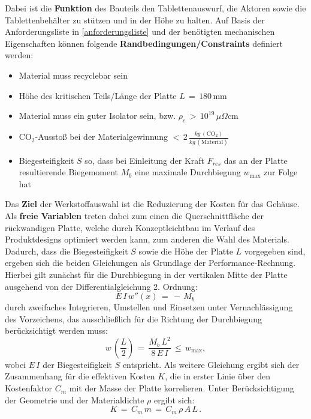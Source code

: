 Dabei ist die \textbf{Funktion} des Bauteils den Tablettenauswurf, die Aktoren sowie die Tablettenbehälter zu stützen und in der Höhe zu halten. Auf Basis der Anforderungsliste in \ref{anforderungsliste} und der benötigten mechanischen Eigenschaften können folgende \textbf{Randbedingungen/Constraints} definiert werden:
\begin{itemize}
	\item Material muss recyclebar sein
	\item Höhe des kritischen Teils/Länge der Platte $L\,=\,180\,$mm
	\item Material muss ein guter Isolator sein, bzw. $\rho_e\,>\,10^{19}\,\mu\Omega$cm
	\item CO$_2$-Ausstoß bei der Materialgewinnung $<\,2\,\frac{kg\,(\text{CO}_2)}{kg\,(\text{Material})}$
	\item Biegesteifigkeit $S$ so, dass bei Einleitung der Kraft $F_{res}$ das an der Platte resultierende Biegemoment $M_b$ eine maximale Durchbiegung $w_{\text{max}}$ zur Folge hat
\end{itemize}
Das \textbf{Ziel} der Werkstoffauswahl ist die Reduzierung der Kosten für das Gehäuse. Als \textbf{freie Variablen} treten dabei zum einen die Querschnittfläche der rückwandigen Platte, welche durch Konzeptleichtbau im Verlauf des Produktdesigns optimiert werden kann, zum anderen die Wahl des Materials.
Dadurch, dass die Biegesteifigkeit $S$ sowie die Höhe der Platte $L$ vorgegeben sind, ergeben sich die beiden Gleichungen als Grundlage der Performance-Rechnung. Hierbei gilt zunächst für die Durchbiegung in der vertikalen Mitte der Platte ausgehend von der Differentialgleichung 2. Ordnung:
\begin{equation}
	E\,I\,w''(x)\,=\,-\,M_b\,
\end{equation}
durch zweifaches Integrieren, Umstellen und Einsetzen unter Vernachlässigung des Vorzeichens, das ausschließlich für die Richtung der Durchbiegung berücksichtigt werden muss:
\begin{equation} \label{durchbiegung}
	w\,\left(\frac{L}{2}\right)\,=\,\frac{M_b \,L^2}{8\,E\,I}\,\le\,w_{\text{max}},
\end{equation}
wobei $E\,I$ der Biegesteifigkeit $S$ entspricht. Als weitere Gleichung ergibt sich der Zusammenhang für die effektiven Kosten $K$, die in erster Linie über den Kostenfaktor $C_m$ mit der Masse der Platte korrelieren. Unter Berücksichtigung der Geometrie und der Materialdichte $\rho$ ergibt sich:
\begin{equation} \label{kosten}
	K\,=\,C_m\,m\,=\,C_m\,\rho\,A\,L\,.
\end{equation}
